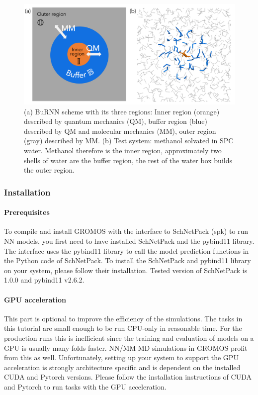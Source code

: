 \begin{figure}[H]
\centering
\includegraphics[scale=.33]{../09_tutorial_06/figures/BuRNN_scheme}
\caption{(a) BuRNN scheme with its three regions: Inner region (orange) described by quantum mechanics (QM), buffer region (blue) described by QM and molecular mechanics (MM), outer region (gray) described by MM. (b) Test system: methanol solvated in SPC water. Methanol therefore is the inner region, approximately two shells of water are the buffer region, the rest of the water box builds the outer region.}
\label{BuRNN_scheme}
\end{figure}


\subsubsection{Installation}
\paragraph{Prerequisites}
To compile and install GROMOS with the interface to SchNetPack (spk) to run NN models, you first need to have installed SchNetPack and the pybind11 library. The interface uses the pybind11 library to call the model prediction functions in the Python code of SchNetPack. To install the SchNetPack and pybind11 library on your system, please follow their installation. Tested version of SchNetPack is 1.0.0 and pybind11 v2.6.2.

\paragraph{GPU acceleration}
This part is optional to improve the efficiency of the simulations. The tasks in this tutorial are small enough to be run CPU-only in reasonable time. For the production runs this is inefficient since the training and evaluation of models on a GPU is usually many-folds faster. NN/MM MD simulations in GROMOS profit from this as well. Unfortunately, setting up your system to support the GPU acceleration is strongly architecture specific and is dependent on the installed CUDA and Pytorch versions. Please follow the installation instructions of CUDA and Pytorch to run tasks with the GPU acceleration.

